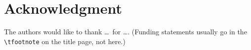 \section*{Acknowledgment}

The authors would like to thank \ldots\ for \ldots. (Funding statements
usually go in the \texttt{\textbackslash tfootnote} on the title page, not here.)
